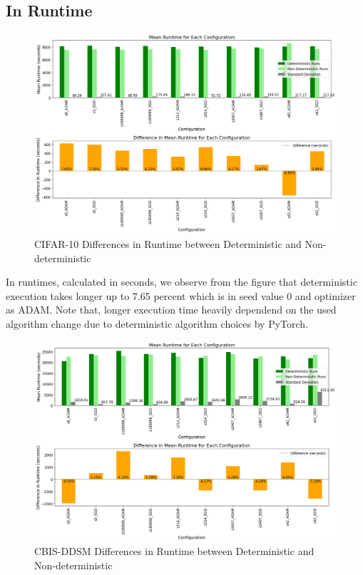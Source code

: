 \clearpage

\subsection{In Runtime}
\begin{figure}[h!]
      \centering
      \includegraphics[width=1\textwidth]{figures/cifar_runtime.png}
      \caption[CIFAR-10 Differences in Runtime between Deterministic and Non-\\deterministic]{CIFAR-10 Differences in Runtime between Deterministic and Non-deterministic}
      \label{fig:cifar10_dif_run}
\end{figure}

In runtimes, calculated in seconds, we observe from the figure that deterministic execution takes longer up to 7.65 percent which is in seed value 0 and optimizer as ADAM. 
Note that, longer execution time heavily dependend on the used algorithm change due to deterministic algorithm choices by PyTorch.


\begin{figure}[h!]
    \centering
    \includegraphics[width=1\textwidth]{figures/mammo_runtime.png}
    \caption{CBIS-DDSM Differences in Runtime between Deterministic and Non-deterministic}
    \label{fig:cbisddsm_dif_run}
\end{figure}

